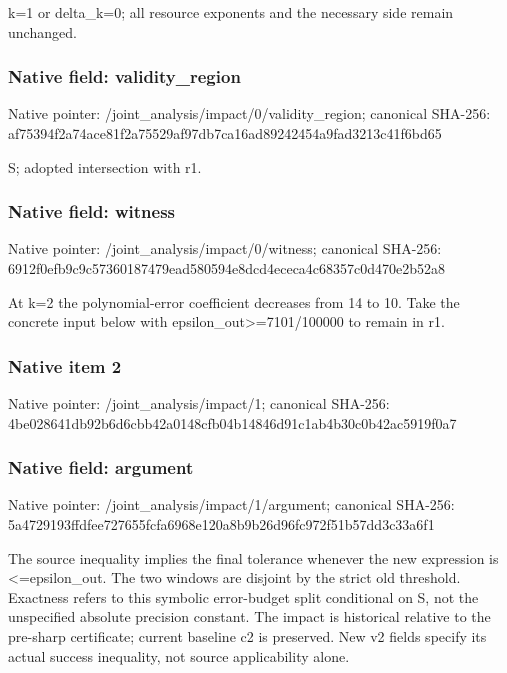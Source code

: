 \documentclass[10pt,a4paper]{article}
\begin{document}
\begingroup\raggedright\sloppy k=\allowbreak{}1 or delta\_\allowbreak{}k=\allowbreak{}0;\allowbreak{} all resource exponents and the necessary side remain unchanged.\par\endgroup

\subsubsection{Native field: validity\_\allowbreak{}region}
Native pointer: /joint\_\allowbreak{}analysis/impact/0/validity\_\allowbreak{}region; canonical SHA-256: af75394f2a74ace81f2a75529af97db7ca16ad89242454a9fad3213c41f6bd65

\begingroup\raggedright\sloppy S;\allowbreak{} adopted intersection with r1.\par\endgroup

\subsubsection{Native field: witness}
Native pointer: /joint\_\allowbreak{}analysis/impact/0/witness; canonical SHA-256: 6912f0efb9c9c57360187479ead580594e8dcd4ececa4c68357c0d470e2b52a8

\begingroup\raggedright\sloppy At k=\allowbreak{}2 the polynomial-error coefficient decreases from 14 to 10. Take the concrete input below with epsilon\_\allowbreak{}out>=\allowbreak{}7101/\allowbreak{}100000 to remain in r1.\par\endgroup

\subsubsection{Native item 2}
Native pointer: /joint\_\allowbreak{}analysis/impact/1; canonical SHA-256: 4be028641db92b6d6cbb42a0148cfb04b14846d91c1ab4b30c0b42ac5919f0a7

\subsubsection{Native field: argument}
Native pointer: /joint\_\allowbreak{}analysis/impact/1/argument; canonical SHA-256: 5a4729193ffdfee727655fcfa6968e120a8b9b26d96fc972f51b57dd3c33a6f1

\begingroup\raggedright\sloppy The source inequality implies the final tolerance whenever the new expression is <=\allowbreak{}epsilon\_\allowbreak{}out. The two windows are disjoint by the strict old threshold. Exactness refers to this symbolic error-budget split conditional on S,\allowbreak{} not the unspecified absolute precision constant. The impact is historical relative to the pre-sharp certificate;\allowbreak{} current baseline c2 is preserved. New v2 fields specify its actual success inequality,\allowbreak{} not source applicability alone.\par\endgroup
\end{document}
